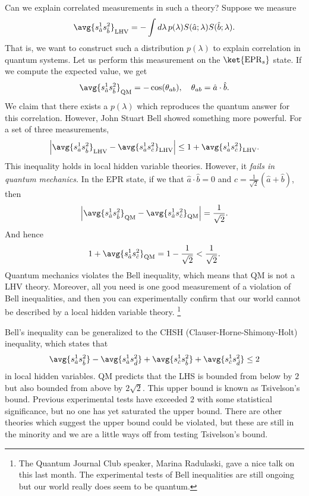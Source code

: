 Can we explain correlated measurements in such a theory? Suppose we measure
\begin{equation}
    \avg{s_{\hat a}^1 s_{\hat b}^2}_\text{LHV} = -\int d\lambda \, p(\lambda) S(\hat a; \lambda) S(\hat b; \lambda).
\end{equation}
That is, we want to construct such a distribution $p(\lambda)$ to explain correlation in quantum systems. Let us perform this measurement on the $\ket{\text{EPR}_s}$ state. If we compute the expected value, we get
\begin{equation}
    \avg{s_{\hat a}^1 s_{\hat b}^2}_\text{QM} = -\cos(\theta_{ab}),\quad \theta_{ab} = \hat a \cdot \hat b.
\end{equation}
We claim that there exists a $p(\lambda)$ which reproduces the quantum answer for this correlation. However, John Stuart Bell showed something more powerful. For a set of three measurements,
\begin{equation}
    \abs*{\avg{s_{\hat a}^1 s_{\hat b}^2}_\text{LHV} - \avg{s_{\hat a}^1 s_{\hat c}^2}_\text{LHV}} \leq 1 + \avg{s_{\hat a}^1 s_{\hat c}^2}_\text{LHV}.
\end{equation}
This inequality holds in local hidden variable theories. However, it \emph{fails in quantum mechanics.} In the EPR state, if we that $\hat a \cdot \hat b =0$ and $c=\frac{1}{\sqrt{2}}(\hat a + \hat b)$, then
\begin{equation}
    \left|\avg{s_{\hat a}^1 s_{\hat b}^2}_\text{QM} - \avg{s_{\hat a}^1 s_{\hat c}^2}_\text{QM}\right| =\frac{1}{\sqrt{2}}.
\end{equation}
And hence
\begin{equation}
    1+ \avg{s_{\hat a}^1 s_{\hat c}^2}_\text{QM} = 1-\frac{1}{\sqrt{2}} < \frac{1}{\sqrt{2}}.
\end{equation}
Quantum mechanics violates the Bell inequality, which means that QM is not a LHV theory. Moreover, all you need is one good measurement of a violation of Bell inequalities, and then you can experimentally confirm that our world cannot be described by a local hidden variable theory.%
    \footnote{The Quantum Journal Club speaker, Marina Radulaski, gave a nice talk on this last month. The experimental tests of Bell inequalities are still ongoing but our world really does seem to be quantum.}

Bell's inequality can be generalized to the CHSH (Clauser-Horne-Shimony-Holt) inequality, which states that
\begin{equation}
    \avg{s_{\hat a}^1 s_{\hat b}^2} - \avg{s_{\hat a}^1 s_{\hat d}^2} + \avg{s_{\hat c}^1 s_{\hat b}^2} + \avg{s_{\hat c}^1 s_{\hat d}^2} \leq 2
\end{equation}
in local hidden variables. QM predicts that the LHS is bounded from below by $2$ but also bounded from above by $2\sqrt{2}$. This upper bound is known as Tsivelson's bound. Previous experimental tests have exceeded $2$ with some statistical significance, but no one has yet saturated the upper bound. There are other theories which suggest the upper bound could be violated, but these are still in the minority and we are a little ways off from testing Tsivelson's bound.

